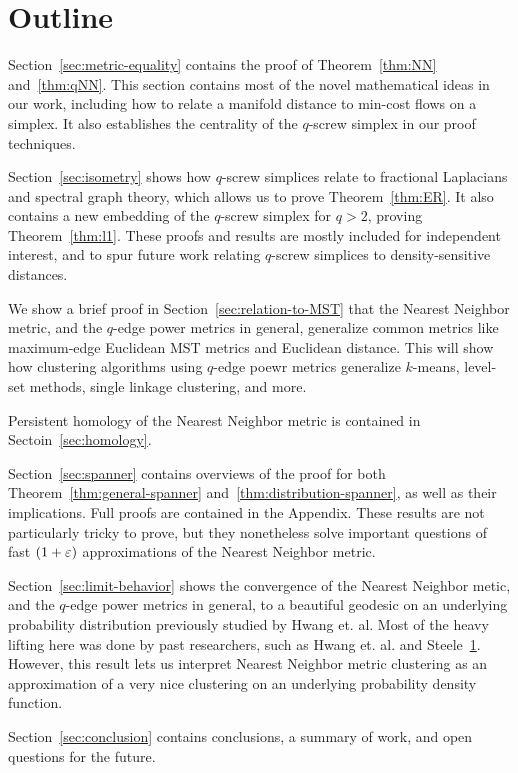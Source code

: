 \section{Outline}
%  
Section~\ref{sec:metric-equality} contains the proof of Theorem~\ref{thm:NN}
and~\ref{thm:qNN}. This section contains most of the novel mathematical
ideas in our work, including how to relate a manifold distance to min-cost
flows on a simplex. It also establishes the centrality of the $q$-screw
simplex in our proof techniques.

Section~\ref{sec:isometry} shows how $q$-screw simplices relate to
fractional Laplacians and spectral graph theory, which allows us to prove
Theorem~\ref{thm:ER}. It also contains a new embedding of the $q$-screw
simplex for $q>2$, proving Theorem~\ref{thm:l1}. These proofs and results
are mostly included for independent interest, and to spur future work
relating $q$-screw simplices to density-sensitive distances.

We show a brief proof in Section~\ref{sec:relation-to-MST} that the Nearest
Neighbor metric, and the $q$-edge power metrics in general, generalize common
metrics like maximum-edge Euclidean MST metrics and Euclidean distance.
This will show how clustering algorithms using $q$-edge poewr metrics
generalize $k$-means, level-set methods, single linkage clustering, and
more.

Persistent homology of the Nearest Neighbor metric is contained in
Sectoin~\ref{sec:homology}.

Section~\ref{sec:spanner} contains overviews of the proof for both
Theorem~\ref{thm:general-spanner} and~\ref{thm:distribution-spanner}, as
well as their implications. Full
proofs are contained in the Appendix. These results are not particularly
tricky to prove, but they nonetheless solve important questions of fast
$(1+\varepsilon)$ approximations of the Nearest Neighbor metric.

Section~\ref{sec:limit-behavior} shows the convergence of the Nearest Neighbor
metic, and the $q$-edge power metrics in general, to a beautiful geodesic
on an underlying probability distribution previously studied by Hwang et.
al. Most of the heavy lifting here was done by past researchers, such as
Hwang et. al. and Steele~\ref{}. However, this result lets us interpret
Nearest Neighbor metric clustering as an approximation of a very nice
clustering on an underlying probability density function.

Section~\ref{sec:conclusion} contains conclusions, a summary of work, and
open questions for the future.
